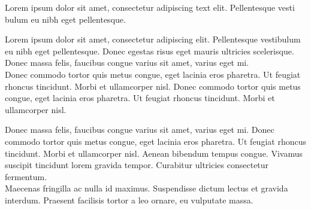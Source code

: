 \begin{frame}
\hspace*{1mm}
\begin{minipage}[t]{0.95\textwidth}
\raggedright
\vspace*{1mm}
\begin{multicols}{3}
\begin{minipage}[t]{\columnwidth}
\vspace{-1mm} 
\scriptsize
\raggedright
\linespread{1.2}\selectfont
\alert{Lorem ipsum dolor sit
amet, consectetur
adipiscing text elit.
Pellentesque vesti
bulum eu nibh eget
pellentesque.}
\end{minipage}
\vfill
\columnbreak
\tiny
Lorem ipsum dolor sit amet,
consectetur adipiscing elit.
Pellentesque vestibulum eu nibh
eget pellentesque. Donec egestas
risus eget mauris ultricies
scelerisque. Donec massa felis,
faucibus congue varius sit amet,
varius eget mi.\\
Donec commodo tortor quis
metus congue, eget lacinia eros
pharetra. Ut feugiat rhoncus
tincidunt. Morbi et ullamcorper
nisl. Donec commodo tortor quis
metus congue, eget lacinia eros
pharetra. Ut feugiat rhoncus
tincidunt. Morbi et ullamcorper
nisl.

Donec massa felis, faucibus
congue varius sit amet, varius
eget mi. Donec commodo tortor
quis metus congue, eget lacinia
eros pharetra. Ut feugiat rhoncus
tincidunt. Morbi et ullamcorper
nisl. Aenean bibendum tempus
congue. Vivamus suscipit
tincidunt lorem gravida tempor.
Curabitur ultricies consectetur
fermentum.\\
Maecenas fringilla ac nulla id
maximus. Suspendisse dictum
lectus et gravida interdum.
Praesent facilisis tortor a leo
ornare, eu vulputate massa.

\end{multicols}
\end{minipage}
\end{frame}

